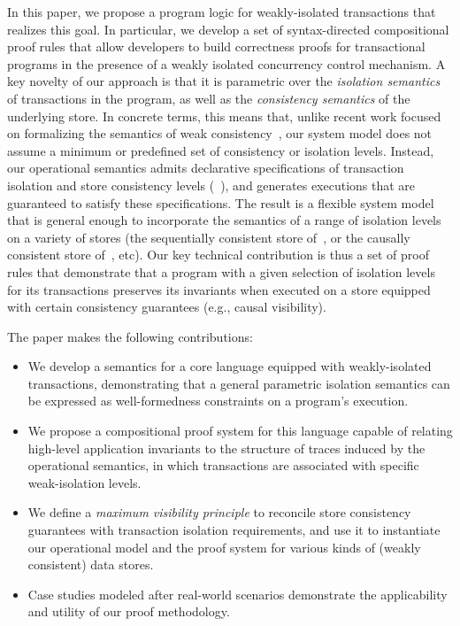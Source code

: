 
In this paper, we propose a program logic for weakly-isolated
transactions that realizes this goal.  In particular, we develop a set
of syntax-directed compositional proof rules that allow developers to
build correctness proofs for transactional programs in the presence of
a weakly isolated concurrency control mechanism.  A key novelty of our
approach is that it is parametric over the \emph{isolation semantics}
of transactions in the program, as well as the \emph{consistency
  semantics} of the underlying store. In concrete terms, this means
that, unlike recent work focused on formalizing the semantics of weak
consistency~\cite{gotsmanpopl16, redblueatc, ecinec}, our system model
does not assume a minimum or predefined set of consistency or
isolation levels. Instead, our operational semantics admits
declarative specifications of transaction isolation and store
consistency levels (\eg~\cite{pldi15,gotsmanconcur15}), and generates
executions that are guaranteed to satisfy these specifications. The
result is a flexible system model that is general enough to
incorporate the semantics of a range of isolation levels on a variety
of stores (\eg the sequentially consistent store of~\cite{adyaphd}, or
the causally consistent store of~\cite{gotsmanpopl16}, etc).  Our key
technical contribution is thus a set of proof rules that demonstrate
that a program with a given selection of isolation levels for its
transactions preserves its invariants when executed on a store
equipped with certain consistency guarantees (e.g., causal
visibility).

The paper makes the following contributions:
\begin{itemize}
  \item We develop a semantics for a core language equipped with
    weakly-isolated transactions, demonstrating that a general
    parametric isolation semantics can be expressed as
    well-formedness constraints on a program's execution.
  \item We propose a compositional proof system for this language
    capable of relating high-level application invariants to the structure
    of traces induced by the operational semantics, in which transactions
    are associated with specific weak-isolation levels.
  \item We define a \emph{maximum visibility principle} to reconcile
    store consistency guarantees with transaction isolation
    requirements, and use it to instantiate our operational model and
    the proof system for various kinds of (weakly consistent) data
    stores.
  \item Case studies modeled after real-world scenarios demonstrate
    the applicability and utility of our proof methodology.
\end{itemize}

